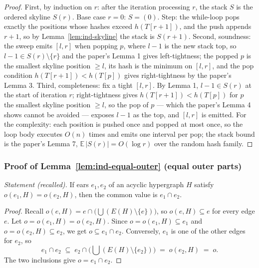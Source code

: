 \begin{proof}
First, by induction on $r$: after the iteration processing $r$, the stack $S$ is the
ordered skyline $S(r)$. Base case $r = 0$: $S = (0)$. Step: the while-loop pops
exactly the positions whose hashes exceed $h(T[r+1])$, and the push appends $r+1$, so
by Lemma~\ref{lem:ind-skyline} the stack is $S(r+1)$. Second, soundness: the sweep
emits $[l,r]$ when popping $p$, where $l - 1$ is the new stack top, so
$l - 1 \in S(r) \setminus \{r\}$ and the paper's Lemma 1 gives left-tightness; the
popped $p$ is the smallest skyline position $\ge l$, its hash is the minimum on
$[l,r]$, and the pop condition $h(T[r+1]) < h(T[p])$ gives right-tightness by the
paper's Lemma 3. Third, completeness: fix a tight $[l,r]$. By Lemma 1,
$l - 1 \in S(r)$ at the start of iteration $r$; right-tightness gives
$h(T[r+1]) < h(T[p])$ for $p$ the smallest skyline position $\ge l$, so the pop of $p$
--- which the paper's Lemma 4 shows cannot be avoided --- exposes $l-1$ as the top,
and $[l,r]$ is emitted. For the complexity: each position is pushed once and popped at
most once, so the loop body executes $O(n)$ times and emits one interval per pop; the
stack bound is the paper's Lemma 7, $\mathbb{E}\,|S(r)| = O(\log r)$ over the random
hash family.
\end{proof}

\subsubsection*{Proof of Lemma~\ref{lem:ind-equal-outer} (equal outer parts)}
{\itshape Statement (recalled).} If ears $e_1, e_2$ of an acyclic hypergraph $H$
satisfy $o(e_1,H) = o(e_2,H)$, then the common value is $e_1 \cap e_2$.\eop

\begin{proof}
Recall $o(e,H) = e \cap \bigl(\bigcup (E(H) \setminus \{e\})\bigr)$, so
$o(e,H) \subseteq e$ for every edge $e$. Let $o = o(e_1,H) = o(e_2,H)$. Since
$o = o(e_1,H) \subseteq e_1$ and $o = o(e_2,H) \subseteq e_2$, we get
$o \subseteq e_1 \cap e_2$. Conversely, $e_1$ is one of the other edges for $e_2$, so
\[
e_1 \cap e_2 \;\subseteq\; e_2 \cap \bigl(\bigcup (E(H) \setminus \{e_2\})\bigr)
\;=\; o(e_2,H) \;=\; o .
\]
The two inclusions give $o = e_1 \cap e_2$.
\end{proof}



